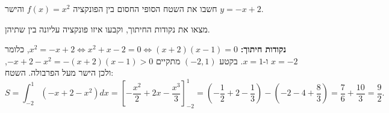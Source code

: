 
\begin{question}
חשבו את השטח הסופי החסום בין הפונקציה $f(x)=x^2$ והישר $y=-x+2$.
\end{question}

\begin{hint}
מצאו את נקודות החיתוך, וקבעו איזו פונקציה עליונה בין שתיהן.
\end{hint}

\begin{solution}
\textbf{נקודות חיתוך:} $x^2=-x+2\iff x^2+x-2=0\iff (x+2)(x-1)=0$, כלומר $x=-2$ ו-$x=1$.
בקטע $(-2,1)$ מתקיים $-x+2-x^2=-(x+2)(x-1)>0$, ולכן הישר מעל הפרבולה. השטח:
\[ S=\int_{-2}^{1}\left(-x+2-x^2\right)dx=\left[-\frac{x^2}{2}+2x-\frac{x^3}{3}\right]_{-2}^{1}
=\left(-\frac12+2-\frac13\right)-\left(-2-4+\frac83\right)=\frac76+\frac{10}{3}=\boxed{\frac92}. \]
\end{solution}
